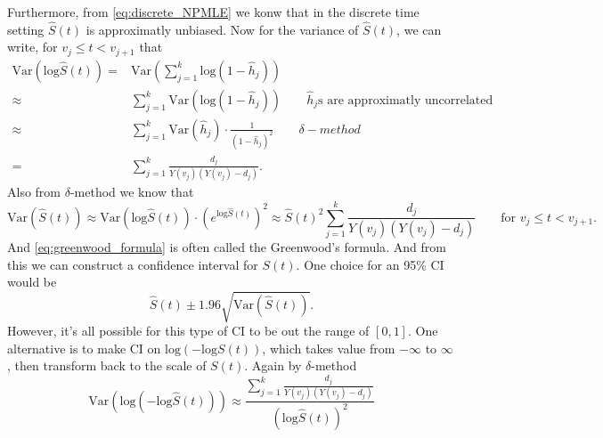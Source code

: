 \documentclass[a4paper,12pt]{article}
\begin{document}
\par

Furthermore, from \eqref{eq:discrete_NPMLE} we konw that in the discrete time setting $\hat{S}\left(t\right)$ is approximatly unbiased. Now for the variance of $\hat{S}\left(t\right)$, we can write, for $v_j \leq t < v_{j + 1}$ that
\[
  \begin{aligned}
    \mathrm{Var}\left(\mathrm{log}\hat{S}\left(t\right)\right)
    =& \mathrm{Var}\left(
      \sum\limits_{j = 1}^k\mathrm{log}\left(1 - \hat{h}_j\right)
    \right)    \\
    \approx& \sum\limits_{j = 1}^k\mathrm{Var}\left(
      \mathrm{log}\left(1 - \hat{h}_j\right)
    \right)
    \quad\quad \hat{h}_j\text{s are approximatly uncorrelated}    \\
    \approx& \sum\limits_{j = 1}^k
    \mathrm{Var}\left(\hat{h}_j\right)
    \cdot
    \frac{1}{\left(1 - \hat{h}_j\right)^2}
    \quad\quad \delta-method    \\
    =& \sum\limits_{j = 1}^k
    \frac{d_j}{Y\left(v_j\right)\left(Y\left(v_j\right) - d_j\right)}
    .
  \end{aligned}
\]
Also from $\delta$-method we know that
\begin{equation}
  \label{eq:greenwood_formula}
  \mathrm{Var}\left(\hat{S}\left(t\right)\right)
  \approx
  \mathrm{Var}\left(\mathrm{log}\hat{S}\left(t\right)\right)
  \cdot
  \left(
    e^{\mathrm{log}\hat{S}\left(t\right)}
  \right)^2
  \approx
  \hat{S}\left(t\right)^2
  \sum\limits_{j = 1}^k
  \frac{d_j}{Y\left(v_j\right)\left(Y\left(v_j\right) - d_j\right)}
  \quad\quad \text{for } v_j \leq t < v_{j + 1}.
\end{equation}
And \eqref{eq:greenwood_formula} is often called the {\color{red}Greenwood's formula}. And from this we can construct a confidence interval for $S\left(t\right)$. One choice for an 95\% CI would be
\[
  \hat{S}\left(t\right) \pm 1.96 \sqrt{\mathrm{Var}\left(\hat{S}\left(t\right)\right)}
  .
\]
However, it's all possible for this type of CI to be out the range of $[0, 1]$. One alternative is to make CI on $\mathrm{log}\left(-\mathrm{log}S\left(t\right)\right)$, which takes value from $-\infty$ to $\infty$, then transform back to the scale of $S\left(t\right)$. Again by $\delta$-method
\[
  \mathrm{Var}\left(
    \mathrm{log}\left(-\mathrm{log}\hat{S}\left(t\right)\right)
  \right)
  \approx
  \frac{
    \sum\limits_{j = 1}^k
    \frac{d_j}{Y\left(v_j\right)\left(Y\left(v_j\right) - d_j\right)}
  }{
    \left(
      \mathrm{log}\hat{S}\left(t\right)
    \right)^2
  }
\]
\end{document}
